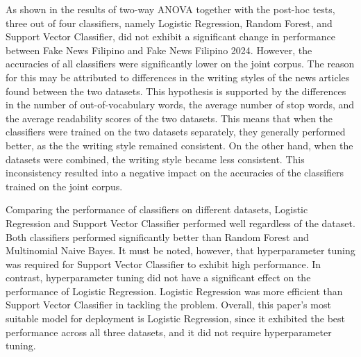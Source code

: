 As shown in the results of two-way ANOVA together with the post-hoc tests, three out of four classifiers, namely Logistic Regression, Random Forest, and Support Vector Classifier, did not exhibit a significant change in performance between Fake News Filipino and Fake News Filipino 2024. However, the accuracies of all classifiers were significantly lower on the joint corpus. The reason for this may be attributed to differences in the writing styles of the news articles found between the two datasets. This hypothesis is supported by the differences in the number of out-of-vocabulary words, the average number of stop words, and the average readability scores of the two datasets. This means that when the classifiers were trained on the two datasets separately, they generally performed better, as the the writing style remained consistent. On the other hand, when the datasets were combined, the writing style became less consistent. This inconsistency resulted into a negative impact on the accuracies of the classifiers trained on the joint corpus. 

Comparing the performance of classifiers on different datasets, Logistic Regression and Support Vector Classifier performed well regardless of the dataset. Both classifiers performed significantly better than Random Forest and Multinomial Naive Bayes. It must be noted, however, that hyperparameter tuning was required for Support Vector Classifier to exhibit high performance. In contrast, hyperparameter tuning did not have a significant effect on the performance of Logistic Regression. Logistic Regression was more efficient than Support Vector Classifier in tackling the problem. Overall, this paper's most suitable model for deployment is Logistic Regression, since it exhibited the best performance across all three datasets, and it did not require hyperparameter tuning.